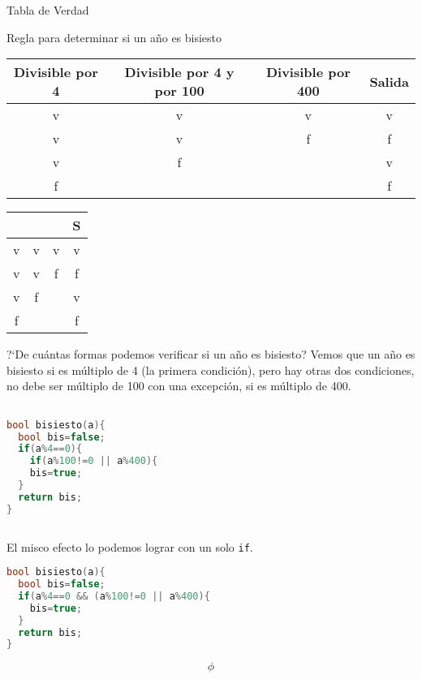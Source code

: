 \documentclass[a4paper,oneside,10pt]{article}%
\author{Prof. en Matem\'atica e Inform\'atica \\ Armando B. VERA}
\title{}
\begin{document}
\begin{flushright}
\end{flushright}

\begin{mbRta}{Tabla de Verdad}

Regla para determinar si un a\~no es bisiesto

\begin{tabular}{|c|c|c|c|}
\hline
Divisible por 4 & Divisible por 4 y por 100 & Divisible por 400 & Salida \\
\hline 
v & v & v & v \\
\hline
v & v & f & f \\
\hline
v & f &  & v \\
\hline
f & & & f \\
\hline
\end{tabular}


\begin{tabular}{|c|c|c|c|}
\hline
  &  &  & S \\
\hline 
v & v & v & v \\
\hline
v & v & f & f \\
\hline
v & f &  & v \\
\hline
f & & & f \\
\hline
\end{tabular}

?`De cu\'antas formas podemos verificar si un a\~no es bisiesto?
Vemos que un a\~no es bisiesto si es m\'ultiplo de 4 (la primera condici\'on), pero hay otras dos condiciones, no debe ser m\'ultiplo de 100 con una excepci\'on, si es m\'ultiplo de 400.


\begin{cajaCTN}{}
\begin{lstlisting}[language=C++]

bool bisiesto(a){
  bool bis=false;
  if(a%4==0){
    if(a%100!=0 || a%400){
    bis=true;
  }
  return bis;
}
    
\end{lstlisting}
\end{cajaCTN}
El misco efecto lo podemos lograr con un solo \texttt{if}.

\begin{cajaCTN}{}
\begin{lstlisting}[language=C++]
bool bisiesto(a){
  bool bis=false;
  if(a%4==0 && (a%100!=0 || a%400){
    bis=true;
  }
  return bis;
}
\end{lstlisting}
\end{cajaCTN}
 
\end{mbRta}

\Huge
$$ \phi $$

\normalsize
\end{document}
